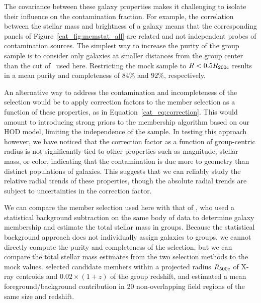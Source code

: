 The covariance between these galaxy properties makes it challenging to
isolate their influence on the contamination fraction. For example,
the correlation between the stellar mass and brightness of a
galaxy means that the corresponding panels of
Figure~\ref{cat_fig:memstat_all} are related and not independent probes of
contamination sources. The simplest
way to increase the purity of the group sample is to consider only
galaxies at smaller distances from the group center than the cut of
\rvir\ used here. Restricting the mock sample to $R<0.5\mbox{$R_{200\rm{c}}$}$ results
in a mean purity and completeness of $84\%$ and $92\%$, respectively.

An alternative way to address the contamination and incompleteness of
the selection would be to apply correction factors to the member
selection as a function of these properties, as in
Equation~\ref{cat_eq:correction}. This would amount to introducing strong 
priors to the membership algorithm based on our HOD model, limiting
the independence of the sample. In testing this approach however, we
have noticed that the correction factor as a function of group-centric
radius is not significantly tied to other properties such as
magnitude, stellar mass, or color, indicating that the contamination
is due more to geometry than distinct populations of galaxies. This
suggests that we can reliably study the relative radial trends of
these properties, though the absolute radial trends are subject to
uncertainties in the correction factor.

We can compare the member selection used here with that of
\citet{Giodini2009}, who used a statistical background subtraction on
the same body of data to determine galaxy membership and estimate the total
stellar mass in groups. Because the statistical background approach
does not individually assign galaxies to groups, we cannot
directly compute the purity and completeness of the selection, but we
can compare the total stellar mass estimates from the two selection
methods to the mock values. \citet{Giodini2009} selected candidate members
within a projected radius $R_{500\rm{c}}$ of X-ray centroids and $0.02\times(1+z)$ of the
group redshift, and estimated a mean foreground/background
contribution in 20 non-overlapping field regions of the same size and
redshift. 

